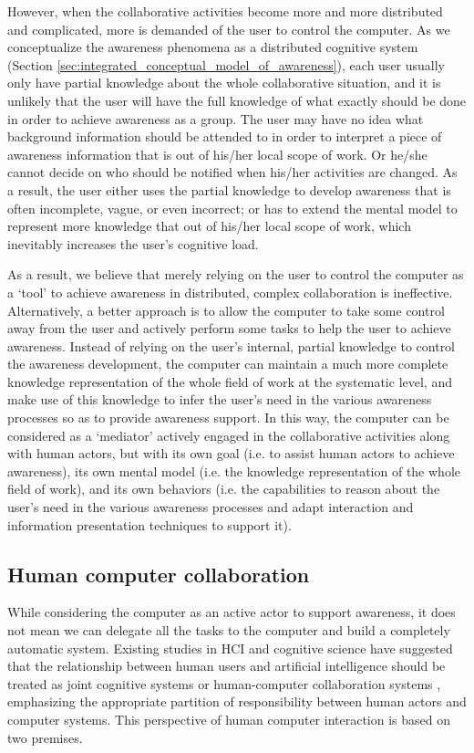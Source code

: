 However, when the collaborative activities become more and more distributed and complicated, more is demanded of the user to control the computer. As we conceptualize the awareness phenomena as a distributed cognitive system (Section \ref{sec:integrated_conceptual_model_of_awareness}), each user usually only have partial knowledge about the whole collaborative situation, and it is unlikely that the user will have the full knowledge of what exactly should be done in order to achieve awareness as a group. The user may have no idea what background information should be attended to in order to interpret a piece of awareness information that is out of his/her local scope of work. Or he/she cannot decide on who should be notified when his/her activities are changed. As a result, the user either uses the partial knowledge to develop awareness that is often incomplete, vague, or even incorrect; or has to extend the mental model to represent more knowledge that out of his/her local scope of work, which inevitably increases the user's cognitive load. 

As a result, we believe that merely relying on the user to control the computer as a `tool' to achieve awareness in distributed, complex collaboration is ineffective. Alternatively, a better approach is to allow the computer to take some control away from the user and actively perform some tasks to help the user to achieve awareness. Instead of relying on the user's internal, partial knowledge to control the awareness development, the computer can maintain a much more complete knowledge representation of the whole field of work at the systematic level, and make use of this knowledge to infer the user's need in the various awareness processes so as to provide awareness support. In this way, the computer can be considered as a `mediator' actively engaged in the collaborative activities along with human actors, but with its own goal (i.e. to assist human actors to achieve awareness), its own mental model (i.e. the knowledge representation of the whole field of work), and its own behaviors (i.e. the capabilities to reason about the user's need in the various awareness processes and adapt interaction and information presentation techniques to support it).

\subsection{Human computer collaboration} %
\label{sub:human_computer_collaboration}
While considering the computer as an active actor to support awareness, it does not mean we can delegate all the tasks to the computer and build a completely automatic system. Existing studies in HCI and cognitive science have suggested that the relationship between human users and artificial intelligence should be treated as joint cognitive systems \cite{Dalal1994} or human-computer collaboration systems \cite{Terveen1995}, emphasizing the appropriate partition of responsibility between human actors and computer systems. This perspective of human computer interaction is based on two premises.


